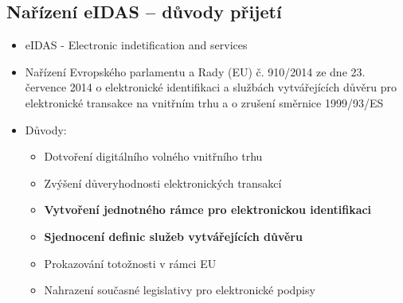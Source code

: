 \subsection{Nařízení eIDAS -- důvody přijetí}
\begin{itemize}
      \item eIDAS - Electronic indetification and services
      \item Nařízení Evropského parlamentu a Rady (EU) č. 910/2014 ze dne 23. července 2014 o elektronické identifikaci
            a službách vytvářejících důvěru pro elektronické transakce na vnitřním trhu a o zrušení směrnice 1999/93/ES
      \item Důvody:
            \begin{itemize}
                  \item Dotvoření digitálního volného vnitřního trhu
                  \item Zvýšení důveryhodnosti elektronických transakcí
                  \item \textbf{Vytvoření jednotného rámce pro elektronickou identifikaci}
                  \item \textbf{Sjednocení definic služeb vytvářejících důvěru}
                  \item Prokazování totožnosti v rámci EU
                  \item Nahrazení současné legislativy pro elektronické podpisy
            \end{itemize}
\end{itemize}


